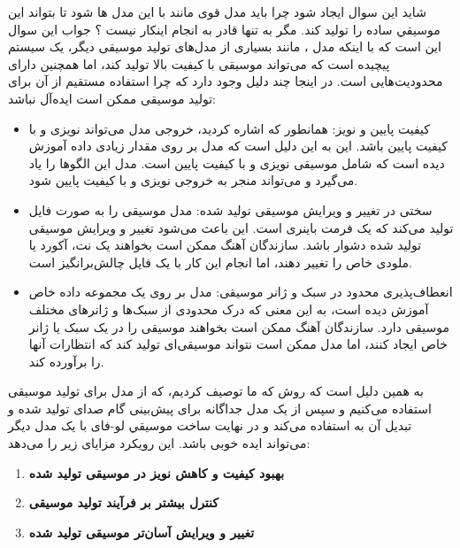 شاید این سوال ایجاد شود چرا باید مدل قوی مانند  با این مدل ها  شود تا بتواند این موسیقي ساده را تولید کند. مگر به تنها قادر به انجام اینکار نیست ؟ جواب این سوال این است که با اینکه
مدل ، مانند بسیاری از مدل‌های تولید موسیقی دیگر، یک سیستم پیچیده
است که می‌تواند موسیقی با کیفیت بالا تولید کند، اما همچنین دارای
محدودیت‌هایی است. در اینجا چند دلیل وجود دارد که چرا استفاده مستقیم از آن
برای تولید موسیقی ممکن است ایده‌آل نباشد:


\begin{itemize}
      \item{کیفیت پایین و نویز}: همانطور که اشاره کردید، خروجی مدل
             می‌تواند نویزی و با کیفیت پایین باشد. این به این دلیل است که
            مدل بر روی مقدار زیادی داده آموزش دیده است که شامل موسیقی نویزی و با
            کیفیت پایین است. مدل این الگوها را یاد می‌گیرد و می‌تواند منجر به خروجی
            نویزی و با کیفیت پایین شود.
      \item{سختی در تغییر و ویرایش موسیقی تولید شده}: مدل  موسیقی
            را به صورت فایل  تولید می‌کند که یک فرمت باینری است. این باعث می‌شود
            تغییر و ویرایش موسیقی تولید شده دشوار باشد. سازندگان آهنگ ممکن است
            بخواهند یک نت، آکورد یا ملودی خاص را تغییر دهند، اما انجام این کار با
            یک فایل  چالش‌برانگیز است.
      \item{انعطاف‌پذیری محدود در سبک و ژانر موسیقی}: مدل  بر روی
            یک مجموعه داده خاص آموزش دیده است، به این معنی که درک محدودی از سبک‌ها
            و ژانرهای مختلف موسیقی دارد. سازندگان آهنگ ممکن است بخواهند موسیقی را
            در یک سبک یا ژانر خاص ایجاد کنند، اما مدل  ممکن است نتواند
            موسیقی‌ای تولید کند که انتظارات آنها را برآورده کند.
\end{itemize}

به همین دلیل است که روش که ما توصیف کردیم، که از مدل  برای
تولید موسیقی استفاده می‌کنیم و سپس از یک مدل جداگانه
برای پیش‌بینی گام صدای تولید شده و تبدیل آن
به  استفاده می‌کند و در نهایت ساخت موسیقي لو-فای با یک مدل دیگر می‌تواند ایده خوبی باشد. این رویکرد مزایای زیر را می‌دهد:

\begin{enumerate}
      \def\labelenumi{\arabic{enumi}.}
      \item
            \textbf{بهبود کیفیت و کاهش نویز در موسیقی تولید شده}
      \item
            \textbf{کنترل بیشتر بر فرآیند تولید موسیقی}
      \item
            \textbf{تغییر و ویرایش آسان‌تر موسیقی تولید شده}
\end{enumerate}

